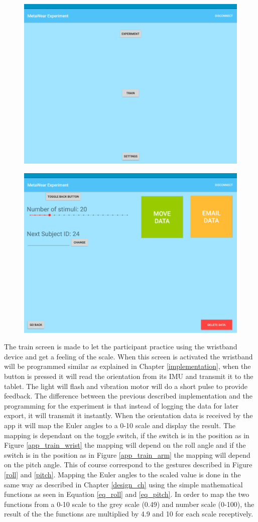 \begin{figure}[h!]
    \centering
    \includegraphics[width=0.6\linewidth]{figures/tablet_screen0.png}
  \label{app_main}
\end{figure}

\begin{figure}[h!]
    \centering
  \includegraphics[width=0.6\linewidth]{figures/tablet_screen1.png}
  \label{app_settings}
\end{figure}




The train screen is made to let the participant practice using the wristband device and get a feeling of the scale. When this screen is activated the wristband will be programmed similar as explained in Chapter \ref{implementation}, when the button is pressed it will read the orientation from its IMU and transmit it to the tablet. The light will flash and vibration motor will do a short pulse to provide feedback. The difference between the previous described implementation and the programming for the experiment is that instead of logging the data for later export, it will transmit it instantly. When the orientation data is received by the app it will map the Euler angles to a 0-10 scale and display the result. The mapping is dependant on the toggle switch, if the switch is in the  position as in Figure \ref{app_train_wrist} the mapping will depend on the roll angle and if the switch is in the  position as in Figure \ref{app_train_arm} the mapping will depend on the pitch angle. This of course correspond to the gestures described in Figure \ref{roll} and \ref{pitch}. Mapping the Euler angles to the scaled value is done in the same way as described in Chapter \ref{design_ch} using the simple mathematical functions as seen in Equation \ref{eq_roll} and \ref{eq_pitch}. In order to map the two functions from a 0-10 scale to the grey scale (0.49) and number scale (0-100), the result of the the functions are multiplied by 4.9 and 10 for each scale receptively.


